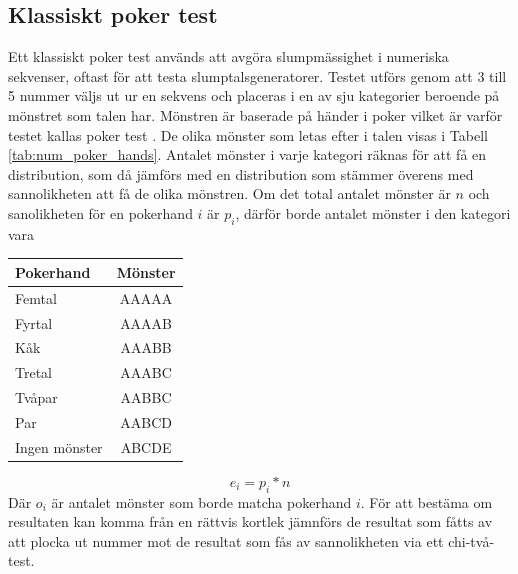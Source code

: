 \documentclass[swedish,a4paper]{article}
\begin{document}
\subsection{Klassiskt poker test}
\label{sec:poker_test}



\noindent
\begin{minipage}[t]{0.6\textwidth}
Ett klassiskt poker test används att avgöra slump\-mässighet i numeriska 
sekvenser, oftast för att testa slumptalsgeneratorer. Testet utförs genom
att 3 till 5 nummer väljs ut ur en sekvens och placeras i en av sju
kategorier beroende på mönstret som talen har.  Mönstren är baserade på händer i poker vilket är varför testet kallas poker test \parencite{Abdel2014}. 
De olika mönster som letas efter i talen visas i Tabell \ref{tab:num_poker_hands}.
\indent
 Antalet mönster i varje kategori räknas för att få en distribution, som
 då jämförs med en distribution som stämmer överens med sannolikheten
 att få de olika mönstren. Om det total antalet mönster är $n$ och
 sanolikheten för en pokerhand $i$ är $p_i$, därför borde antalet mönster i
 den kategori vara 
\end{minipage}%
\hfill
\begin{minipage}[t]{0.40\textwidth}
	\centering
	\captionsetup{width=0.5\textwidth}
        \label{tab:num_poker_hands}
	\begin{tabular}{|l|c|}
	\hline 
	Pokerhand & Mönster \\ \hline  
	Femtal & AAAAA \\ \hline
	Fyrtal & AAAAB \\ \hline
	Kåk & AAABB \\ \hline
	Tretal & AAABC \\ \hline
	Tvåpar & AABBC \\ \hline
	Par & AABCD \\ \hline
    	Ingen mönster & ABCDE \\ \hline
	
\end{tabular}
%
\end{minipage}
$$e_i = p_i * n$$
 Där $o_i$ är antalet mönster som
 borde matcha pokerhand $i$. För att bestäma om resultaten kan komma
 från en rättvis kortlek jämnförs de resultat som fåtts av att plocka
 ut nummer mot de resultat som fås av sannolikheten via ett chi-två-test.
\end{document}
